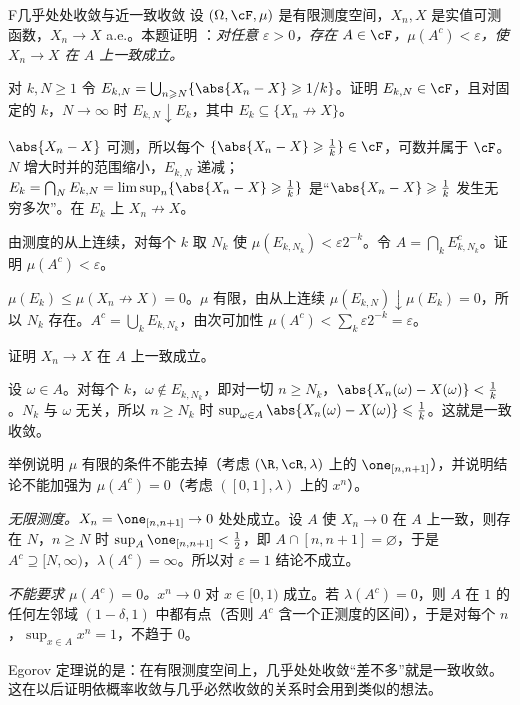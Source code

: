 \begin{probleme}{F}{几乎处处收敛与近一致收敛}
设 $(\Omega,\cF,\mu)$ 是有限测度空间，$X_n,X$ 是实值可测函数，$X_n\to X$ a.e.。本题证明 ：\emph{对任意 $\varepsilon>0$，存在 $A\in\cF$，$\mu(A^c)<\varepsilon$，使 $X_n\to X$ 在 $A$ 上一致成立。}
\begin{questions}
\item 对 $k,N\geqslant1$ 令 $E_{k,N}=\bigcup_{n\geqslant N}\{\abs{X_n-X}\geqslant1/k\}$。证明 $E_{k,N}\in\cF$，且对固定的 $k$，$N\to\infty$ 时 $E_{k,N}\downarrow E_k$，其中 $E_k\subseteq\{X_n\not\to X\}$。
\begin{solution}
$\abs{X_n-X}$ 可测，所以每个 $\{\abs{X_n-X}\geqslant\frac1k\}\in\cF$，可数并属于 $\cF$。$N$ 增大时并的范围缩小，$E_{k,N}$ 递减；$E_k=\bigcap_NE_{k,N}=\limsup_n\{\abs{X_n-X}\geqslant\frac1k\}$ 是“$\abs{X_n-X}\geqslant\frac1k$ 发生无穷多次”。在 $E_k$ 上 $X_n\not\to X$。
\end{solution}
\item 由测度的从上连续，对每个 $k$ 取 $N_k$ 使 $\mu(E_{k,N_k})<\varepsilon2^{-k}$。令 $A=\bigcap_kE_{k,N_k}^c$。证明 $\mu(A^c)<\varepsilon$。
\begin{solution}
$\mu(E_k)\leqslant\mu(X_n\not\to X)=0$。$\mu$ 有限，由从上连续 $\mu(E_{k,N})\downarrow\mu(E_k)=0$，所以 $N_k$ 存在。$A^c=\bigcup_kE_{k,N_k}$，由次可加性 $\mu(A^c)<\sum_k\varepsilon2^{-k}=\varepsilon$。
\end{solution}
\item 证明 $X_n\to X$ 在 $A$ 上一致成立。
\begin{solution}
设 $\omega\in A$。对每个 $k$，$\omega\notin E_{k,N_k}$，即对一切 $n\geqslant N_k$，$\abs{X_n(\omega)-X(\omega)}<\frac1k$。$N_k$ 与 $\omega$ 无关，所以 $n\geqslant N_k$ 时 $\sup_{\omega\in A}\abs{X_n(\omega)-X(\omega)}\leqslant\frac1k$。这就是一致收敛。
\end{solution}
\item 举例说明 $\mu$ 有限的条件不能去掉（考虑 $(\R,\cR,\lambda)$ 上的 $\one_{[n,n+1]}$），并说明结论不能加强为 $\mu(A^c)=0$（考虑 $([0,1],\lambda)$ 上的 $x^n$）。
\begin{solution}
\emph{无限测度。}$X_n=\one_{[n,n+1]}\to0$ 处处成立。设 $A$ 使 $X_n\to0$ 在 $A$ 上一致，则存在 $N$，$n\geqslant N$ 时 $\sup_A\one_{[n,n+1]}<\frac12$，即 $A\cap[n,n+1]=\varnothing$，于是 $A^c\supseteq[N,\infty)$，$\lambda(A^c)=\infty$。所以对 $\varepsilon=1$ 结论不成立。

\emph{不能要求 $\mu(A^c)=0$。}$x^n\to0$ 对 $x\in[0,1)$ 成立。若 $\lambda(A^c)=0$，则 $A$ 在 $1$ 的任何左邻域 $(1-\delta,1)$ 中都有点（否则 $A^c$ 含一个正测度的区间），于是对每个 $n$，$\sup_{x\in A}x^n=1$，不趋于 $0$。

Egorov 定理说的是：在有限测度空间上，几乎处处收敛“差不多”就是一致收敛。这在以后证明依概率收敛与几乎必然收敛的关系时会用到类似的想法。
\end{solution}
\end{questions}
\end{probleme}
